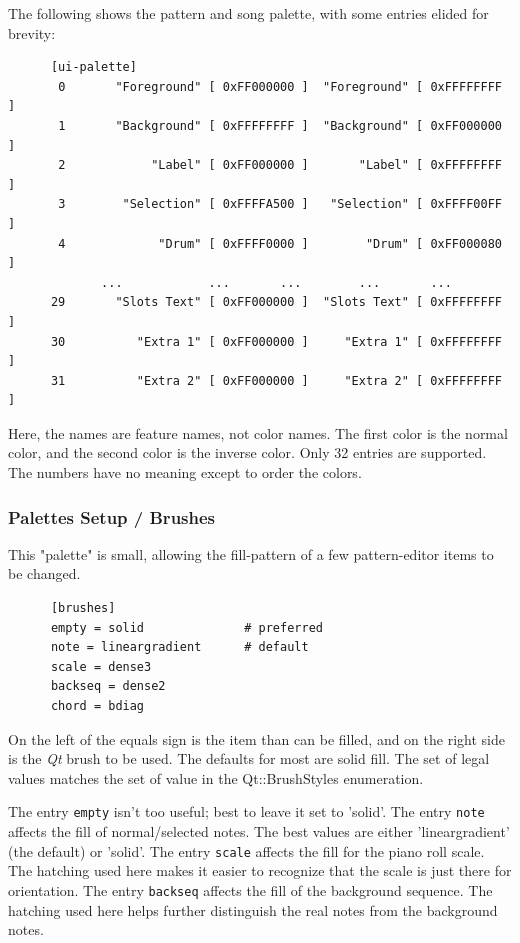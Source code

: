    The following shows the pattern and song palette,
   with some entries elided for brevity:

   \begin{verbatim}
      [ui-palette]
       0       "Foreground" [ 0xFF000000 ]  "Foreground" [ 0xFFFFFFFF ]
       1       "Background" [ 0xFFFFFFFF ]  "Background" [ 0xFF000000 ]
       2            "Label" [ 0xFF000000 ]       "Label" [ 0xFFFFFFFF ]
       3        "Selection" [ 0xFFFFA500 ]   "Selection" [ 0xFFFF00FF ]
       4             "Drum" [ 0xFFFF0000 ]        "Drum" [ 0xFF000080 ]
             ...            ...       ...        ...       ...
      29       "Slots Text" [ 0xFF000000 ]  "Slots Text" [ 0xFFFFFFFF ]
      30          "Extra 1" [ 0xFF000000 ]     "Extra 1" [ 0xFFFFFFFF ]
      31          "Extra 2" [ 0xFF000000 ]     "Extra 2" [ 0xFFFFFFFF ]
   \end{verbatim}

   Here, the names are feature names, not color names.  The first color is the
   normal color, and the second color is the inverse color.  Only 32 entries
   are supported. The numbers have no meaning except to order the colors.

\subsubsection{Palettes Setup / Brushes}
\label{subsubsec:palettes_setup_brushes}

   This "palette" is small, allowing the fill-pattern of a few pattern-editor
   items to be changed.

   \begin{verbatim}
      [brushes]
      empty = solid              # preferred
      note = lineargradient      # default
      scale = dense3
      backseq = dense2
      chord = bdiag
   \end{verbatim}

   On the left of the equals sign is the item than can be filled, and on the
   right side is the \textsl{Qt} brush to be used.  The defaults for most are
   solid fill.
   The set of legal values matches the set
   of value in the Qt::BrushStyles enumeration.

   The entry \texttt{empty} isn't too useful; best to leave it set to 'solid'.
   The entry \texttt{note} affects the fill of normal/selected notes.
   The best values are either 'lineargradient' (the default) or 'solid'.
   The entry \texttt{scale} affects the fill for the piano roll scale.  The
   hatching used here makes it easier to recognize that the scale is just there
   for orientation.
   The entry \texttt{backseq} affects the fill of the background sequence.  The
   hatching used here helps further distinguish the real notes from the
   background notes.

